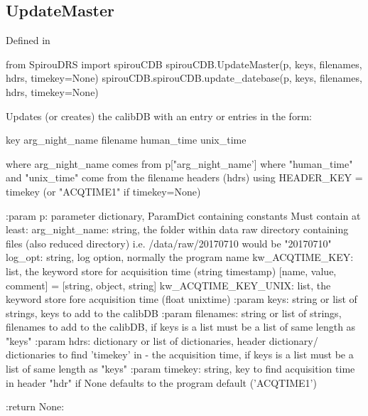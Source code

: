 \begin{minipage}{\textwidth}
\subsection{UpdateMaster}

Defined in \spirouCDB{}

\begin{pythonbox}
from SpirouDRS import spirouCDB
spirouCDB.UpdateMaster(p, keys, filenames, hdrs, timekey=None)
spirouCDB.spirouCDB.update_datebase(p, keys, filenames, hdrs, timekey=None)
\end{pythonbox}

\begin{pythondocstring}
Updates (or creates) the calibDB with an entry or entries in the form:

    {key} {arg_night_name} {filename} {human_time} {unix_time}

where arg_night_name comes from p["arg_night_name']
where "human_time" and "unix_time" come from the filename headers (hdrs)
    using HEADER_KEY = timekey (or "ACQTIME1" if timekey=None)

:param p: parameter dictionary, ParamDict containing constants
    Must contain at least:
            arg_night_name: string, the folder within data raw directory
                            containing files (also reduced directory) i.e.
                            /data/raw/20170710 would be "20170710"
            log_opt: string, log option, normally the program name
            kw_ACQTIME_KEY: list, the keyword store for acquisition time
                            (string timestamp)
                        [name, value, comment] = [string, object, string]
            kw_ACQTIME_KEY_UNIX: list, the keyword store fore acquisition
                                 time (float unixtime)
:param keys: string or list of strings, keys to add to the calibDB
:param filenames: string or list of strings, filenames to add to the
                  calibDB, if keys is a list must be a list of same length
                  as "keys"
:param hdrs: dictionary or list of dictionaries, header dictionary/
             dictionaries to find 'timekey' in - the acquisition time,
             if keys is a list must be a list of same length  as "keys"
:param timekey: string, key to find acquisition time in header "hdr" if
                None defaults to the program default ('ACQTIME1')

:return None:
\end{pythondocstring}
\end{minipage}

